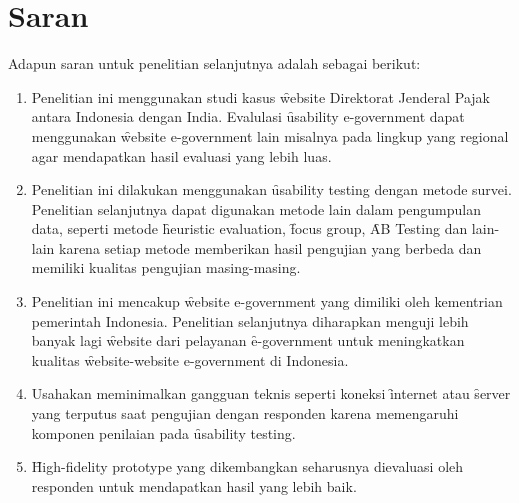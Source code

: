 \section{Saran}
Adapun saran untuk penelitian selanjutnya adalah sebagai berikut:
\begin{enumerate}
	\item Penelitian ini menggunakan studi kasus \f{website} Direktorat Jenderal Pajak antara Indonesia dengan India. Evalulasi \f{usability e-government} dapat menggunakan \f{website e-government} lain misalnya pada lingkup yang regional agar mendapatkan hasil evaluasi yang lebih luas. 
	\item Penelitian ini dilakukan menggunakan \f{usability testing} dengan metode survei. Penelitian selanjutnya dapat digunakan metode lain dalam pengumpulan data, seperti metode \f{heuristic evaluation}, \f{focus group}, \f{AB Testing} dan lain-lain karena setiap metode memberikan hasil pengujian yang berbeda dan memiliki kualitas pengujian masing-masing.
	\item Penelitian ini mencakup \f{website e-government} yang dimiliki oleh kementrian pemerintah Indonesia. Penelitian selanjutnya diharapkan menguji lebih banyak lagi \f{website} dari pelayanan \f{e-government} untuk meningkatkan kualitas \f{website-website e-government} di Indonesia.
	\item Usahakan meminimalkan gangguan teknis seperti koneksi \f{internet} atau \f{server} yang terputus saat pengujian dengan responden karena memengaruhi komponen penilaian pada \f{usability testing}.
	\item \f{High-fidelity prototype} yang dikembangkan seharusnya dievaluasi oleh responden untuk mendapatkan hasil yang lebih baik.
\end{enumerate}
